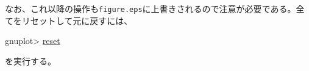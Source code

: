 {なお、これ以降の操作も{\tt figure.eps}に上書きされるので注意が必要である。全てをリセットして元に戻すには、
\begin{commandline2}
gnuplot> \underline{reset}
\end{commandline2} \noindent
を実行する。



}

